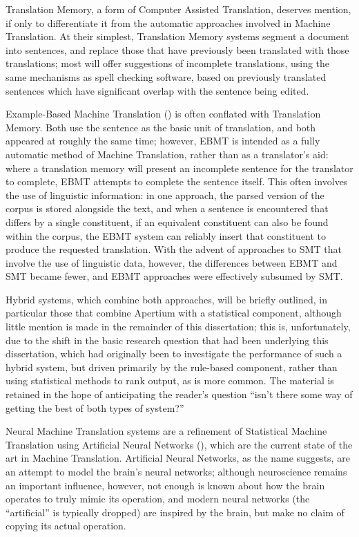 Translation Memory, a form of Computer Assisted Translation, deserves mention, if only to
differentiate it from the automatic approaches involved in Machine Translation. At their
simplest, Translation Memory systems segment a document into sentences, and replace those
that have previously been translated with those translations; most will offer suggestions
of incomplete translations, using the same mechanisms as spell checking software, based on
previously translated sentences which have significant overlap with the sentence being edited.

Example-Based Machine Translation () is often conflated with Translation Memory. Both
use the sentence as the basic unit of translation, and both appeared at roughly the same time;
however, EBMT is intended as a fully automatic method of Machine Translation, rather than as
a translator's aid: where a translation memory will present an incomplete sentence for the
translator to complete, EBMT attempts to complete the sentence itself. This often involves
the use of linguistic information: in one approach, the parsed version of the corpus is stored
alongside the text, and when a sentence is encountered that differs by a single constituent, if
an equivalent constituent can also be found within the corpus, the EBMT system can reliably
insert that constituent to produce the requested translation. With the advent of approaches
to SMT that involve the use of linguistic data, however, the differences between EBMT and SMT
became fewer, and EBMT approaches were effectively subsumed by SMT.

Hybrid systems, which combine both approaches, will be briefly outlined, in particular those
that combine Apertium with a statistical component, although little mention is made in the
remainder of this dissertation; this is, unfortunately, due to the shift in the basic research
question that had been underlying this dissertation, which had originally been to investigate
the performance of such a hybrid system, but driven primarily by the rule-based component,
rather than using statistical methods to rank output, as is more common. The material is retained
in the hope of anticipating the reader's question ``isn't there some way of getting the best of
both types of system?''

Neural Machine Translation systems are a refinement of Statistical Machine Translation using 
Artificial Neural Networks (), which are the current state of the art in Machine 
Translation. Artificial Neural Networks, as the name suggests, are an attempt to model
the brain's neural networks; although neuroscience remains an important influence, however,
not enough is known about how the brain operates to truly mimic its operation, and modern
neural networks (the ``artificial'' is typically dropped) are inspired by the brain, but
make no claim of copying its actual operation.

